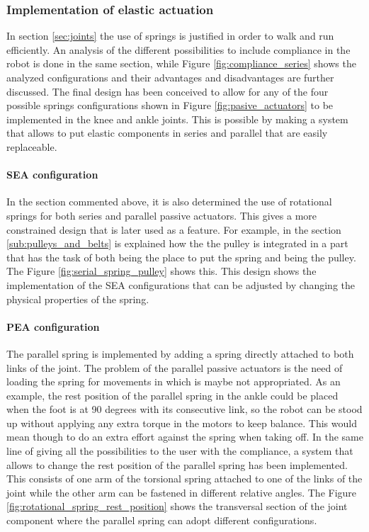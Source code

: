 \subsubsection{Implementation of elastic actuation} %
\label{ssub:spring_integration}
In section \ref{sec:joints} the use of springs is justified in order to walk and run efficiently. 
An analysis of the different possibilities to include compliance in the robot is done in the same section, while Figure \ref{fig:compliance_series} shows the analyzed configurations and their advantages and disadvantages are further discussed.
The final design has been conceived to allow for any of the four possible springs configurations shown in Figure \ref{fig:pasive_actuators} to be implemented in the knee and ankle joints.
This is possible by making a system that allows to put elastic components in series and parallel that are easily replaceable.

\paragraph{SEA configuration} %
\label{para:sea_configuration}

In the section commented above, it is also determined the use of rotational springs for both series and parallel passive actuators.
This gives a more constrained design that is later used as a feature.
For example, in the section \ref{sub:pulleys_and_belts} is explained how the the pulley is integrated in a part that has the task of both being the place to put the spring and being the pulley.
The Figure \ref{fig:serial_spring_pulley} shows this.
This design shows the implementation of the SEA configurations that can be adjusted by changing the physical properties of the spring.

\paragraph{PEA configuration} %
\label{para:pea_configuration}

The parallel spring is implemented by adding a spring directly attached to both links of the joint.
The problem of the parallel passive actuators is the need of loading the spring for movements in which is maybe not appropriated.
As an example, the rest position of the parallel spring in the ankle could be placed when the foot is at 90 degrees with its consecutive link, so the robot can be stood up without applying any extra torque in the motors to keep balance.
This would mean though to do an extra effort against the spring when taking off.
In the same line of giving all the possibilities to the user with the compliance, a system that allows to change the rest position of the parallel spring has been implemented.
This consists of one arm of the torsional spring attached to one of the links of the joint while the other arm can be fastened in different relative angles.
The Figure \ref{fig:rotational_spring_rest_position} shows the transversal section of the joint component where the parallel spring can adopt different configurations. 

